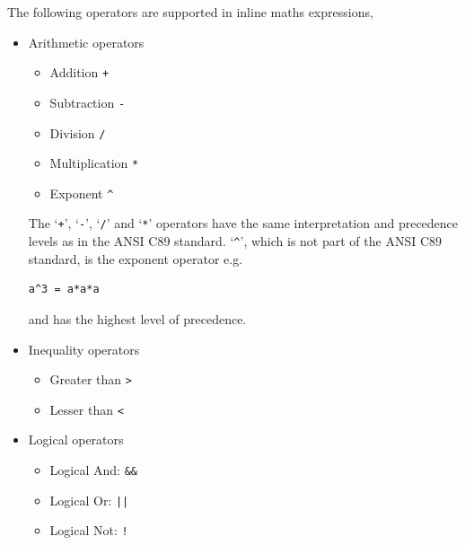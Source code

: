 \documentclass[draftspec]{ninemlspec}
\begin{document}
The following operators are supported in inline maths expressions,
\begin{itemize}
\item Arithmetic operators
\begin{itemize}
\item Addition \verb|+|
\item Subtraction \verb|-|
\item Division \verb|/|
\item Multiplication \verb|*|
\item Exponent \verb|^|
\end{itemize}

The `\verb|+|', `\verb|-|', `\verb|/|' and `\verb|*|' operators have the same interpretation and precedence levels as in the ANSI C89 standard. `\verb|^|', which is not part of the ANSI C89 standard, is the exponent operator e.g.
 \begin{lstlisting}
a^3 = a*a*a
\end{lstlisting}
and has the highest level of precedence.

\item Inequality operators
\begin{itemize}
\item Greater than \verb|>|
\item Lesser than \verb|<|
\end{itemize}

\item Logical operators
\begin{itemize}
\item Logical And: \verb|&&|
\item Logical Or:  \verb+||+
\item Logical Not: \verb|!|
\end{itemize}

\end{itemize}
\end{document}
